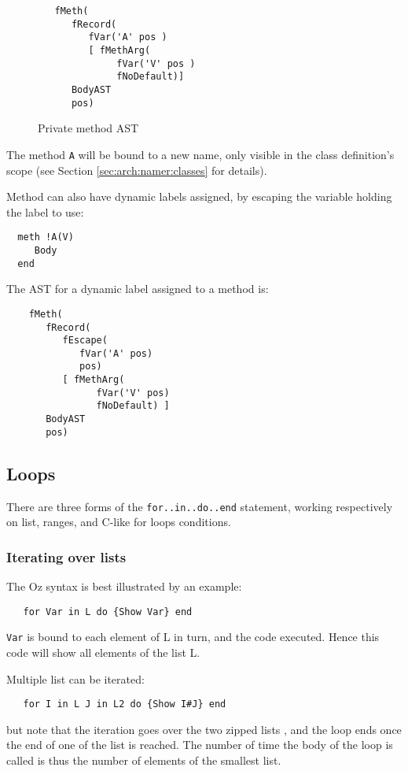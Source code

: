 \documentclass[a4paper]{memoir}
\begin{document}
\begin{figure}[h]
\begin{lstlisting}
   fMeth(
      fRecord(
         fVar('A' pos )
         [ fMethArg(
              fVar('V' pos )
              fNoDefault)]
      BodyAST
      pos)
\end{lstlisting}
\caption{Private method AST}
\label{fig:privatemeth}
\end{figure}

The method \lstinline!A! will be bound to a new name, only visible in the class
definition's scope (see Section \ref{sec:arch:namer:classes} for details).

Method can also have dynamic labels assigned, by escaping the variable holding
the label to use:
\begin{lstlisting}
  meth !A(V)
     Body
  end
\end{lstlisting}
The AST for a dynamic label assigned to a method is:
\begin{lstlisting}
    fMeth(
       fRecord(
          fEscape(
             fVar('A' pos)
             pos)
          [ fMethArg(
                fVar('V' pos)
                fNoDefault) ]
       BodyAST
       pos)

\end{lstlisting}

\subsection{Loops}
There are three forms of the \lstinline!for..in..do..end! statement, working
respectively on list, ranges, and C-like for loops conditions.
\subsubsection{Iterating over lists}
The Oz syntax is best illustrated by an example:
\begin{lstlisting}
   for Var in L do {Show Var} end
\end{lstlisting}
\lstinline!Var! is bound to each element of L in turn, and the code executed.
Hence this code will show all elements of the list L.

Multiple list can be iterated:
\begin{lstlisting}
   for I in L J in L2 do {Show I#J} end
\end{lstlisting}
but note that the iteration goes over the two zipped lists , and the loop ends once the
end of one of the list is reached. The number of time the body of the loop is
called is thus the number of elements of the smallest list.
\end{document}
